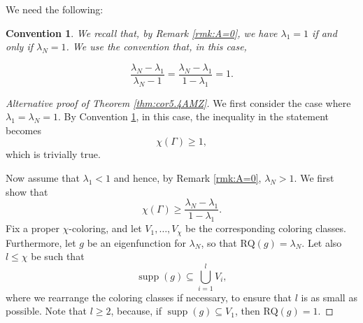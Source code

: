 \documentclass{article}
\newcommand{\RQ}{\textrm{RQ}}
\DeclareMathOperator{\supp}{supp}
\theoremstyle{plain}
\newtheorem{convention}{Convention}
\theoremstyle{definition}
\theoremstyle{remark}
\begin{document}
We need the following:
\begin{convention}\label{conv:1}
We recall that, by Remark \ref{rmk:A=0}, we have $\lambda_1=1$ if and only if $\lambda_N=1$. We use the convention that, in this case, 

\[
\frac{\lambda_N-\lambda_1}{\lambda_N-1} = \frac{\lambda_N-\lambda_1}{1-\lambda_1} = 1.
\]
\end{convention}

\begin{proof}[Alternative proof of Theorem \ref{thm:cor5.4AMZ}]
    We first consider the case where $\lambda_1 = \lambda_N = 1$. By Convention \ref{conv:1}, in this case, the inequality in the statement becomes
    \[
    \chi(\Gamma)\geq 1,
    \]
    which is trivially true.

    Now assume that $\lambda_1<1$ and hence, by Remark \ref{rmk:A=0}, $\lambda_N > 1$.
    We first show that $$\chi(\Gamma)\geq \frac{\lambda_N-\lambda_1}{1-\lambda_1}.$$ Fix a proper $\chi$-coloring, and let $V_1,\ldots,V_\chi$ be the corresponding coloring classes. Furthermore, let $g$ be an eigenfunction for $\lambda_N$, so that $\RQ(g)=\lambda_N$.
    Let also $l\leq \chi$ be such that
    \[
    \supp(g)\subseteq \bigcup_{i=1}^lV_i,
    \]
    where we rearrange the coloring classes if necessary, to ensure that $l$ is as small as possible. Note that $l\geq2$, because, if $\supp(g)\subseteq V_1$, then $\RQ(g)= 1$.


\end{proof}
\end{document}
